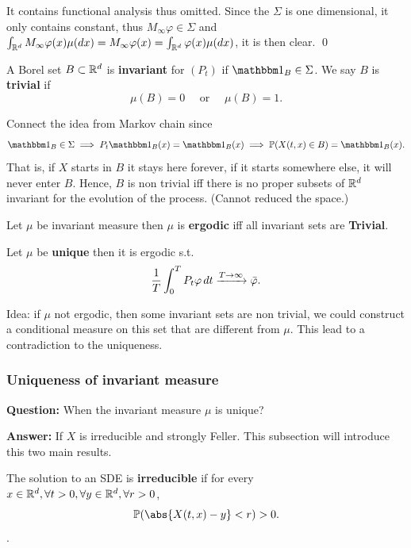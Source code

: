 \pf It contains functional analysis thus omitted. Since the $\Sigma$ is one dimensional, it only contains constant, thus $M_\infty\varphi \in \Sigma$ and $\int_{\mathbb{R}^d} M_\infty \varphi(x) \mu(\mathop{}\!d x) = M_\infty\varphi(x) =  \int_{\mathbb{R}^d} \varphi(x) \mu(\mathop{}\!d x)$, it is then clear.
\qed

\begin{dfn}
A Borel set $B\subset \mathbb{R}^d$ is \textbf{invariant} for $(P_t)$ if $\I{B} \in \Sigma$. We say $B$ is \textbf{trivial} if
\begin{equation*}
    \mu(B) = 0 \quad \text{ or } \quad \mu(B) = 1.
\end{equation*}
\end{dfn}
Connect the idea from Markov chain since 
\begin{equation*}
    \I{B} \in \Sigma \implies P_t \I{B}(x) = \I{B}(x) \implies \prob(X(t,x) \in B) =  \I{B}(x).
\end{equation*}
That is, if $X$ starts in $B$ it stays here forever, if it starts somewhere else, it will never enter $B$. Hence, $B$ is non trivial iff there is no proper subsets of $\mathbb{R}^d$ invariant for the evolution of the process. (Cannot reduced the space.)

\begin{thm} Let $\mu$ be invariant measure then $\mu$ is \textbf{ergodic} iff all invariant sets are \textbf{Trivial}.
\end{thm}

\begin{thm} Let $\mu$ be \textbf{unique} then it is ergodic s.t.
\begin{equation*}
    \frac{1}{T} \int_0^T P_t\varphi \mathop{}\!d t \xrightarrow{T\rightarrow \infty} \bar{\varphi}.
\end{equation*}
\end{thm}
\pf Idea: if $\mu$ not ergodic, then some invariant sets are non trivial, we could construct a conditional measure on this set that are different from $\mu$. This lead to a contradiction to the uniqueness.

\newpage
\subsubsection{Uniqueness of invariant measure}
\textbf{Question: } When the invariant measure $\mu$ is unique? 

\textbf{Answer: }If $X$ is irreducible and strongly Feller. This subsection will introduce this two main results.
\begin{dfn}
The solution to an SDE is \textbf{irreducible} if for every $x\in\mathbb{R}^d, \forall t>0, \forall y \in \mathbb{R}^d, \forall r >0$,
\begin{equation*}
    \prob(\abs{X(t,x) - y} <r) >0.
\end{equation*}.
\end{dfn}

